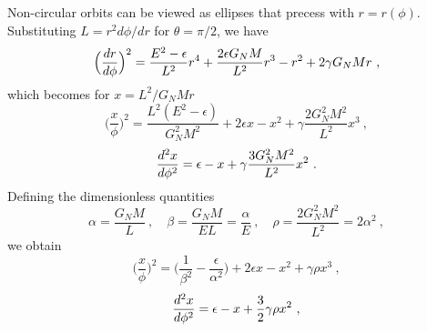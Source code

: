     Non-circular orbits can be viewed as ellipses that precess with $r = r(\phi)$. Substituting $L = r^2 d\phi / dr$ for $\theta = \pi/2$, we have 
    \begin{equation*}
        \Big ( \frac{dr}{d\phi} \Big )^2 = \frac{E^2 - \epsilon}{L^2} r^4 + \frac{2 \epsilon G_N M}{L^2} r^3 - r^2 + 2 \gamma G_N M r  ~,
    \end{equation*}
    which becomes for $x = L^2 / G_N M r$
    \begin{equation*}
        \Big ( \frac{x}{\phi} \Big)^2 = \frac{L^2 (E^2 - \epsilon)}{G_N^2 M^2} + 2 \epsilon x - x^2 + \gamma \frac{2 G_N^2 M^2}{L^2} x^3 ~,
    \end{equation*}
    \begin{equation*}
        \frac{d^2x}{d\phi^2} = \epsilon - x + \gamma \frac{3 G_N^2 M^2}{L^2} x^2 ~.
    \end{equation*}
    Defining the dimensionless quantities 
    \begin{equation*}
        \alpha = \frac{G_N M}{L} ~, \quad \beta = \frac{G_N M}{E L} = \frac{\alpha}{E} ~, \quad \rho = \frac{2 G_N^2 M^2}{L^2} = 2 \alpha^2 ~,
    \end{equation*}
    we obtain
    \begin{equation*}
        \Big ( \frac{x}{\phi} \Big )^2 = \Big ( \frac{1}{\beta^2} - \frac{\epsilon}{\alpha^2}\Big ) + 2 \epsilon x - x^2 + \gamma \rho x^3 ~,
    \end{equation*}
    \begin{equation*}
        \frac{d^2x}{d\phi^2} = \epsilon - x + \frac{3}{2} \gamma \rho x^2 ~,
    \end{equation*}

